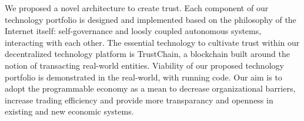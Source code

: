 \documentclass[USenglish]{article}
\begin{document}
We proposed a novel architecture to create trust.
Each component of our technology portfolio is designed and implemented based on the philosophy of the Internet itself: self-governance and loosly coupled autonomous systems, interacting with each other.
The essential technology to cultivate trust within our decentralized technology platform is TrustChain, a blockchain built around the notion of transacting real-world entities.
Viability of our proposed technology portfolio is demonstrated in the real-world, with running code.
Our aim is to adopt the programmable economy as a mean to decrease organizational barriers, increase trading efficiency and provide more transparancy and openness in existing and new economic systems.


%
\end{document}
